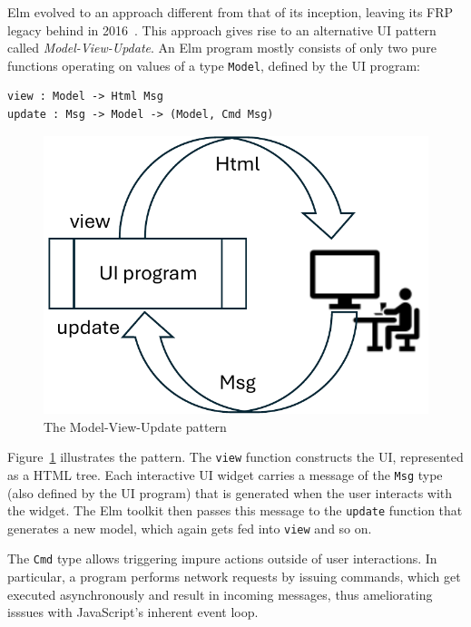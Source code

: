 \documentclass[sigplan,review,screen]{acmart}
\begin{document}
Elm evolved to an approach different from that of its inception,
leaving its FRP legacy behind in 2016~\cite{ElmFarewellFRP}.  This approach
gives rise to an alternative UI pattern called
\textit{Model-View-Update}.  An Elm program mostly consists of only
two pure functions operating on values of a type \texttt{Model},
defined by the UI program:
%
\begin{verbatim}
view : Model -> Html Msg
update : Msg -> Model -> (Model, Cmd Msg)
\end{verbatim}
%
\begin{figure}
  \centering
  \includegraphics[width=0.9\columnwidth]{model-view-update}
  \caption{The Model-View-Update pattern}
  \label{fig:mvu}
\end{figure}
%
Figure~\ref{fig:mvu} illustrates the pattern.
The \texttt{view} function constructs the UI, represented as a HTML
tree.  Each interactive UI widget carries a message of the
\texttt{Msg} type (also defined by the UI program) that is generated
when the user interacts with the widget.  The Elm toolkit then passes
this message to the \texttt{update} function that generates a new
model, which again gets fed into \texttt{view} and so on.

The \texttt{Cmd} type allows triggering impure actions outside of user
interactions.  In particular, a program performs network requests by
issuing commands, which get executed asynchronously and result in
incoming messages, thus ameliorating isssues with JavaScript's
inherent event loop.
\end{document}
